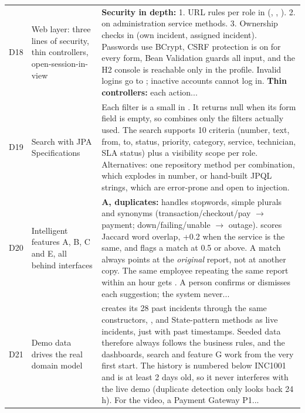 \begin{longtable}{@{}L{0.9cm}L{4.3cm}L{10cm}@{}}
D18 & Web layer: three lines of security, thin controllers, open-session-in-view & \textbf{Security in depth:} 1. URL rules per role in  (, , ). 2.  on administration service methods. 3. Ownership checks in  (own incident, assigned incident). Passwords use BCrypt, CSRF protection is on for every form, Bean Validation guards all input, and the H2 console is reachable only in the  profile. Invalid logins go to ; inactive accounts cannot log in. \textbf{Thin controllers:} each action... \\
D19 & Search with JPA Specifications & Each filter is a small  in . It returns null when its form field is empty, so  combines only the filters actually used. The search supports 10 criteria (number, text, from, to, status, priority, category, service, technician, SLA status) plus a visibility scope per role. Alternatives: one repository method per combination, which explodes in number, or hand-built JPQL strings, which are error-prone and open to injection. \\
D20 & Intelligent features A, B, C and E, all behind interfaces & \textbf{A, duplicates:}  handles stopwords, simple plurals and synonyms (transaction/checkout/pay $\rightarrow$ payment; down/failing/unable $\rightarrow$ outage).  scores Jaccard word overlap, +0.2 when the service is the same, and flags a match at 0.5 or above. A match always points at the \textit{original} report, not at another copy. The same employee repeating the same report within an hour gets . A person confirms or dismisses each suggestion; the system never... \\
D21 & Demo data drives the real domain model &  creates its 28 past incidents through the same constructors, ,  and State-pattern methods as live incidents, just with past timestamps. Seeded data therefore always follows the business rules, and the dashboards, search and feature G work from the very first start. The history is numbered below INC1001 and is at least 2 days old, so it never interferes with the live demo (duplicate detection only looks back 24 h). For the video, a Payment Gateway P1... \\

\end{longtable}
